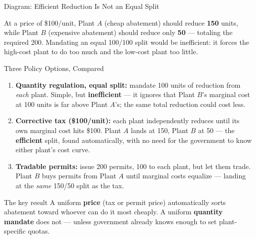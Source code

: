 \documentclass[11pt,aspectratio=169]{beamer}
\begin{document}
\begin{frame}{Diagram: Efficient Reduction Is Not an Equal Split}
  \begin{center}
  \end{center}
  \footnotesize At a price of \$100/unit, Plant $A$ (cheap abatement) should reduce \textbf{150} units, while Plant $B$ (expensive abatement) should reduce only \textbf{50} --- totaling the required 200. Mandating an equal 100/100 split would be inefficient: it forces the high-cost plant to do too much and the low-cost plant too little.
\end{frame}

\begin{frame}{Three Policy Options, Compared}
  \small
  \begin{enumerate}
    \setlength{\itemsep}{3pt}
    \item \textbf{Quantity regulation, equal split:} mandate 100 units of reduction from \emph{each} plant. Simple, but \textbf{inefficient} --- it ignores that Plant $B$'s marginal cost at 100 units is far above Plant $A$'s; the same total reduction could cost less.
    \item \textbf{Corrective tax (\$100/unit):} each plant independently reduces until its own marginal cost hits \$100. Plant $A$ lands at 150, Plant $B$ at 50 --- the \textbf{efficient} split, found automatically, with no need for the government to know either plant's cost curve.
    \item \textbf{Tradable permits:} issue 200 permits, 100 to each plant, but let them trade. Plant $B$ buys permits from Plant $A$ until marginal costs equalize --- landing at the \emph{same} 150/50 split as the tax.
  \end{enumerate}
  \vspace{0.2em}
  \begin{alertblock}{The key result}
    A uniform \textbf{price} (tax or permit price) automatically sorts abatement toward whoever can do it most cheaply. A uniform \textbf{quantity mandate} does not --- unless government already knows enough to set plant-specific quotas.
  \end{alertblock}
\end{frame}
\end{document}
